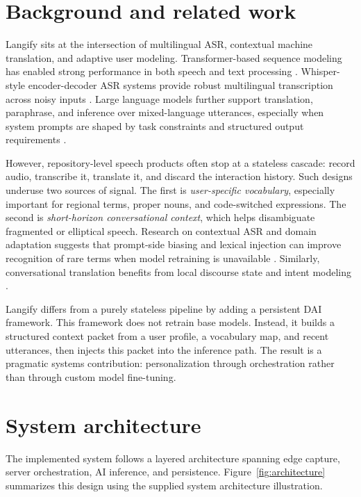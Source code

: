 \documentclass[twocolumn]{svjour3}
\begin{document}
\section{Background and related work}
\label{sec:related}
Langify sits at the intersection of multilingual ASR, contextual machine translation, and adaptive user modeling. Transformer-based sequence modeling has enabled strong performance in both speech and text processing \cite{RefTransformer}. Whisper-style encoder-decoder ASR systems provide robust multilingual transcription across noisy inputs \cite{RefWhisper}. Large language models further support translation, paraphrase, and inference over mixed-language utterances, especially when system prompts are shaped by task constraints and structured output requirements \cite{RefLlama,RefPrompting}.

However, repository-level speech products often stop at a stateless cascade: record audio, transcribe it, translate it, and discard the interaction history. Such designs underuse two sources of signal. The first is \emph{user-specific vocabulary}, especially important for regional terms, proper nouns, and code-switched expressions. The second is \emph{short-horizon conversational context}, which helps disambiguate fragmented or elliptical speech. Research on contextual ASR and domain adaptation suggests that prompt-side biasing and lexical injection can improve recognition of rare terms when model retraining is unavailable \cite{RefContextASR}. Similarly, conversational translation benefits from local discourse state and intent modeling \cite{RefContextMT}.

Langify differs from a purely stateless pipeline by adding a persistent DAI framework. This framework does not retrain base models. Instead, it builds a structured context packet from a user profile, a vocabulary map, and recent utterances, then injects this packet into the inference path. The result is a pragmatic systems contribution: personalization through orchestration rather than through custom model fine-tuning.

\section{System architecture}
\label{sec:architecture}
The implemented system follows a layered architecture spanning edge capture, server orchestration, AI inference, and persistence. Figure~\ref{fig:architecture} summarizes this design using the supplied system architecture illustration.
\end{document}
